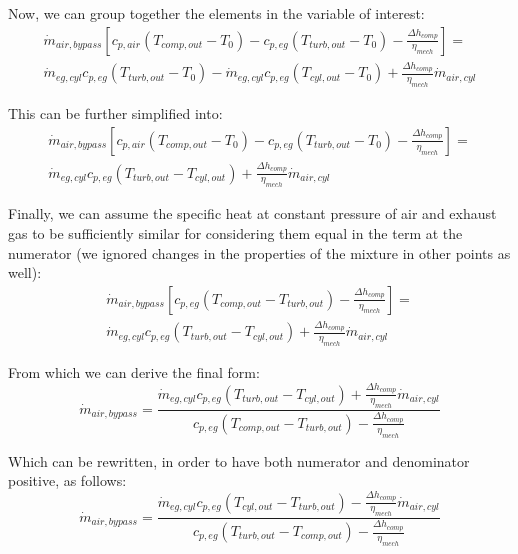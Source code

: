 \documentclass[preprint,12pt]{elsarticle}
\begin{document}
Now, we can group together the elements in the variable of interest:
\begin{multline}
\dot{m}_{air,bypass} \left[ c_{p,air} (T_{comp,out} - T_0) - c_{p,eg} (T_{turb,out} - T_0) - \frac{\Delta h_{comp}}{\eta_{mech}} \right] = \\
\dot{m}_{eg,cyl} c_{p,eg} (T_{turb,out} - T_0) - \dot{m}_{eg,cyl} c_{p,eg}  (T_{cyl,out} - T_0) + \frac{\Delta h_{comp}}{\eta_{mech}}\dot{m}_{air,cyl}
\end{multline}

This can be further simplified into:
\begin{multline}
\dot{m}_{air,bypass} \left[ c_{p,air} (T_{comp,out} - T_0) - c_{p,eg} (T_{turb,out} - T_0) - \frac{\Delta h_{comp}}{\eta_{mech}} \right] = \\
\dot{m}_{eg,cyl} c_{p,eg} (T_{turb,out} - T_{cyl,out}) + \frac{\Delta h_{comp}}{\eta_{mech}}\dot{m}_{air,cyl}
\end{multline}

Finally, we can assume the specific heat at constant pressure of air and exhaust gas to be sufficiently similar for considering them equal in the term at the numerator (we ignored changes in the properties of the mixture in other points as well):
\begin{multline}
\dot{m}_{air,bypass} \left[ c_{p,eg} (T_{comp,out} - T_{turb,out}) - \frac{\Delta h_{comp}}{\eta_{mech}} \right] = \\
\dot{m}_{eg,cyl} c_{p,eg} (T_{turb,out} - T_{cyl,out}) + \frac{\Delta h_{comp}}{\eta_{mech}}\dot{m}_{air,cyl}
\end{multline}

From which we can derive the final form:
\begin{equation}
\dot{m}_{air,bypass} = \frac{\dot{m}_{eg,cyl} c_{p,eg} (T_{turb,out} - T_{cyl,out}) + \frac{\Delta h_{comp}}{\eta_{mech}}\dot{m}_{air,cyl}}{c_{p,eg} (T_{comp,out} - T_{turb,out}) - \frac{\Delta h_{comp}}{\eta_{mech}}} 
\end{equation}

Which can be rewritten, in order to have both numerator and denominator positive, as follows:
\begin{equation}
\dot{m}_{air,bypass} = \frac{\dot{m}_{eg,cyl} c_{p,eg} (T_{cyl,out} - T_{turb,out}) - \frac{\Delta h_{comp}}{\eta_{mech}}\dot{m}_{air,cyl}}{c_{p,eg} (T_{turb,out} - T_{comp,out}) - \frac{\Delta h_{comp}}{\eta_{mech}}} 
\end{equation}
\end{document}
